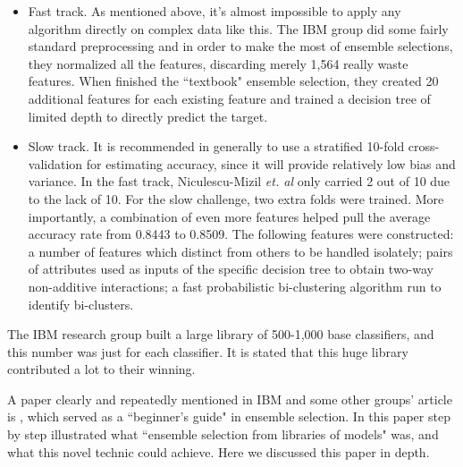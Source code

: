 \documentclass[journal]{IEEEtran}
\begin{document}
\begin{itemize}
  \item Fast track. As mentioned above, it's almost impossible to apply any algorithm directly on complex data like this. The IBM group did some fairly standard preprocessing and in order to make the most of ensemble selections, they normalized all the features, discarding merely 1,564 really waste features. When finished the ``textbook" ensemble selection, they created 20 additional features for each existing feature and trained a decision tree of limited depth to directly predict the target.
  \item Slow track. It is recommended in \cite{Ref:DataMiningConceptsandTechniques} generally to use a stratified 10-fold cross-validation for estimating accuracy, since it will provide relatively low bias and variance. In the fast track, Niculescu-Mizil \emph{et. al} only carried 2 out of 10 due to the lack of 10. For the slow challenge, two extra folds were trained. More importantly, a combination of even more features helped pull the average accuracy rate from 0.8443 to 0.8509. The following features were constructed: a number of features which distinct from others to be handled isolately; pairs of attributes used as inputs of the specific decision tree to obtain two-way non-additive interactions; a fast probabilistic bi-clustering algorithm \cite{Ref:AnEfficientVotingAlgorithmForFindingBiclusters} run to identify bi-clusters.
\end{itemize}
The IBM research group built a large library of 500-1,000 base classifiers, and this number was just for each classifier. It is stated that this huge library contributed a lot to their winning.
\par
A paper clearly and repeatedly mentioned in IBM and some other groups' article is \cite{Ref:EnsembleSelectionFromLibraryOfModels}, which served as a ``beginner's guide" in ensemble selection. In this paper step by step illustrated what ``ensemble selection from libraries of models" was, and what this novel technic could achieve. Here we discussed this paper in depth.
\end{document}
